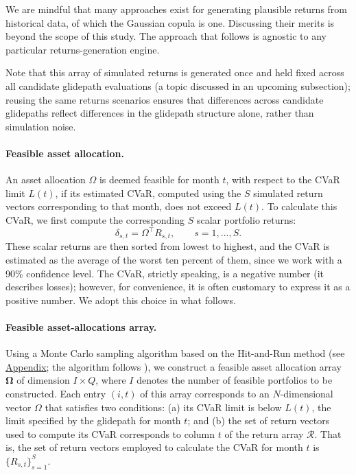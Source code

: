 \documentclass[11pt]{article}
\begin{document}
We are mindful that many approaches exist for generating plausible returns from historical data, of which the Gaussian copula is one. Discussing their merits is beyond the scope of this study. The approach that follows is agnostic to any particular returns-generation engine.

Note that this array of simulated returns is generated once and held fixed across all candidate glidepath evaluations (a topic discussed in an upcoming subsection); reusing the same returns scenarios ensures that differences across candidate glidepaths reflect differences in the glidepath structure alone, rather than simulation noise.


\paragraph{Feasible asset allocation.}
An asset allocation $\Omega$ is deemed feasible for month $t$, with respect to the CVaR limit $L(t)$, if its estimated CVaR, computed using the $S$ simulated return vectors corresponding to that month, does not exceed $L(t)$. To calculate this CVaR, we first compute the corresponding $S$ scalar portfolio returns:
\begin{equation}
\delta_{s,t} = \Omega^{\top}R_{s,t}, \qquad s=1,\ldots,S.
\end{equation}
These scalar returns are then sorted from lowest to highest, and the CVaR is estimated as the average of the worst ten percent of them, since we work with a 90\% confidence level.  The CVaR, strictly speaking, is a negative number (it describes losses); however, for convenience, it is often customary to express it as a positive number.  We adopt this choice in what follows. 

\paragraph{Feasible asset-allocations array.}
Using a Monte Carlo sampling algorithm based on the Hit-and-Run method (see \hyperref[app:hit-and-run]{Appendix}; the algorithm follows \citet{smith1984}), we construct a feasible asset allocation array  $\mathbf{\Omega}$  of dimension $I \times Q$, where $I$ denotes the number of feasible portfolios to be constructed. Each entry $(i,t)$ of this array corresponds to an $N$-dimensional vector $\Omega$ that satisfies two conditions: (a) its CVaR limit is below $L(t)$, the limit specified by the glidepath for month $t$; and (b) the set of return vectors used to compute its CVaR corresponds to column $t$ of the return array $\mathcal{R}$. That is, the set of return vectors employed to calculate the CVaR for month $t$ is $\{R_{s,t}\}_{s=1}^{S}$.
\end{document}
